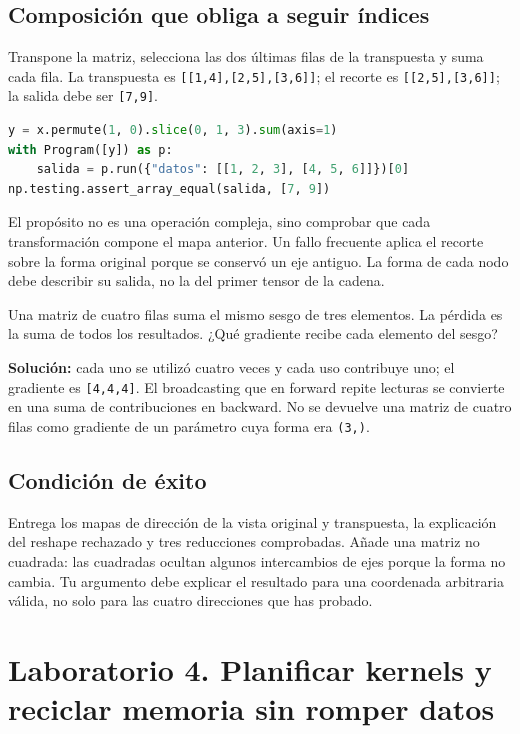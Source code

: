 \documentclass[12pt,a4paper,oneside]{report}
\begin{document}
\section{Composición que obliga a seguir índices}
Transpone la matriz, selecciona las dos últimas filas de la transpuesta y suma cada fila. La transpuesta es \texttt{[[1,4],[2,5],[3,6]]}; el recorte es \texttt{[[2,5],[3,6]]}; la salida debe ser \texttt{[7,9]}.

\begin{lstlisting}[language=Python]
y = x.permute(1, 0).slice(0, 1, 3).sum(axis=1)
with Program([y]) as p:
    salida = p.run({"datos": [[1, 2, 3], [4, 5, 6]]})[0]
np.testing.assert_array_equal(salida, [7, 9])
\end{lstlisting}
El propósito no es una operación compleja, sino comprobar que cada transformación compone el mapa anterior. Un fallo frecuente aplica el recorte sobre la forma original porque se conservó un eje antiguo. La forma de cada nodo debe describir su salida, no la del primer tensor de la cadena.

\begin{practica}
Una matriz de cuatro filas suma el mismo sesgo de tres elementos. La pérdida es la suma de todos los resultados. ¿Qué gradiente recibe cada elemento del sesgo?

\textbf{Solución:} cada uno se utilizó cuatro veces y cada uso contribuye uno; el gradiente es \texttt{[4,4,4]}. El broadcasting que en forward repite lecturas se convierte en una suma de contribuciones en backward. No se devuelve una matriz de cuatro filas como gradiente de un parámetro cuya forma era \texttt{(3,)}.

\end{practica}
\section{Condición de éxito}
Entrega los mapas de dirección de la vista original y transpuesta, la explicación del reshape rechazado y tres reducciones comprobadas. Añade una matriz no cuadrada: las cuadradas ocultan algunos intercambios de ejes porque la forma no cambia. Tu argumento debe explicar el resultado para una coordenada arbitraria válida, no solo para las cuatro direcciones que has probado.

\chapter{Laboratorio 4. Planificar kernels y reciclar memoria sin romper datos}
\label{lab:cuatro}
\end{document}
